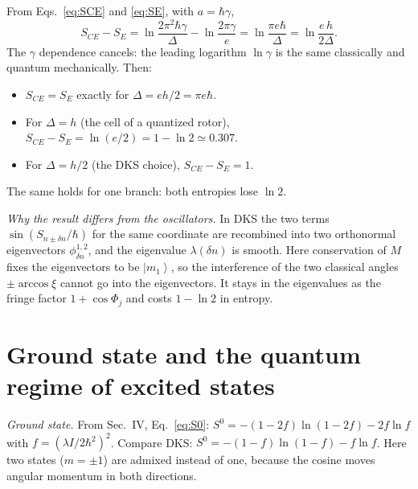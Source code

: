 \documentclass[aps,pra,onecolumn,notitlepage,nofootinbib,11pt]{revtex4-2}
\newcommand{\ket}[1]{\left|#1\right\rangle}
\begin{document}
From Eqs.~\eqref{eq:SCE} and \eqref{eq:SE}, with $a=\hbar\gamma$,
\begin{equation}
S_{CE}-S_{E}=\ln\frac{2\pi^{2}\hbar\gamma}{\Delta}-\ln\frac{2\pi\gamma}{e}
=\ln\frac{\pi e\hbar}{\Delta}=\ln\frac{e\,h}{2\Delta}.
\label{eq:diff}
\end{equation}
The $\gamma$ dependence cancels: the leading logarithm $\ln\gamma$ is the same
classically and quantum mechanically. Then:
\begin{itemize}
\item $S_{CE}=S_{E}$ exactly for $\Delta=eh/2=\pi e\hbar$.
\item For $\Delta=h$ (the cell of a quantized rotor), $S_{CE}-S_{E}=\ln(e/2)=1-\ln2\simeq0.307$.
\item For $\Delta=h/2$ (the DKS choice), $S_{CE}-S_{E}=1$.
\end{itemize}
The same holds for one branch: both entropies lose $\ln2$.

\emph{Why the result differs from the oscillators.} In DKS the two terms
$\sin(S_{n\pm\delta n}/\hbar)$ for the same coordinate are recombined into two orthonormal
eigenvectors $\phi^{1,2}_{\delta n}$, and the eigenvalue $\lambda(\delta n)$ is smooth. Here
conservation of $M$ fixes the eigenvectors to be $\ket{m_{1}}$, so the interference of
the two classical angles $\pm\arccos\xi$ cannot go into the eigenvectors. It stays in
the eigenvalues as the fringe factor $1+\cos\Phi_{j}$ and costs $1-\ln2$ in entropy.

\section{Ground state and the quantum regime of excited states}

\emph{Ground state.} From Sec.~IV, Eq.~\eqref{eq:S0}:
$S^{0}=-(1-2f)\ln(1-2f)-2f\ln f$ with $f=(\lambda I/2\hbar^{2})^{2}$. Compare DKS:
$S^{0}=-(1-f)\ln(1-f)-f\ln f$. Here two states ($m=\pm1$) are admixed instead of one,
because the cosine moves angular momentum in both directions.
\end{document}
